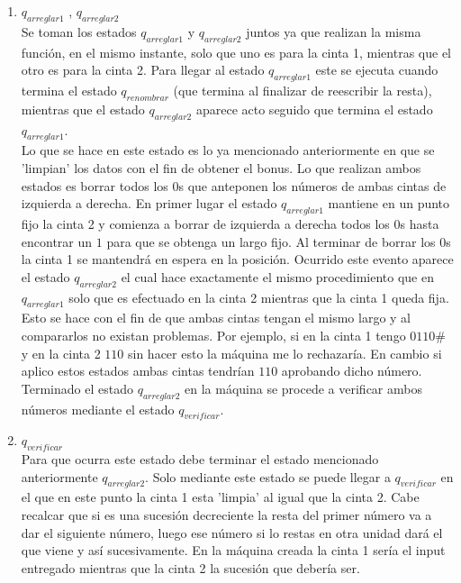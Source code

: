 \documentclass[12pt]{article}
\begin{document}
\begin{enumerate}
      \item {\large $q_{arreglar1}$ , $q_{arreglar2}$}  \vspace{0.2cm}\\
      Se toman los estados $q_{arreglar1}$ y $q_{arreglar2}$ juntos ya que realizan la misma función, en el mismo instante, solo que uno es para la cinta 1, mientras que el otro es para la cinta 2. Para llegar al estado  $q_{arreglar1}$ este se ejecuta cuando termina el estado $q_{renombrar}$ (que termina al finalizar de reescribir la resta), mientras que el estado $q_{arreglar2}$ aparece acto seguido que termina el estado $q_{arreglar1}$. \\
      Lo que se hace en este estado es lo ya mencionado anteriormente en que se 'limpian' los datos con el fin de obtener el bonus. Lo que realizan ambos estados es borrar todos los $0$s que anteponen los números de ambas cintas de izquierda a derecha. En primer lugar el estado $q_{arreglar1}$ mantiene en un punto fijo la cinta 2 y comienza a borrar de izquierda a derecha todos los $0$s hasta encontrar un $1$ para que se obtenga un largo fijo. Al terminar de borrar los $0$s la cinta 1 se mantendrá en espera en la posición. Ocurrido este evento aparece el estado $q_{arreglar2}$ el cual hace exactamente el mismo procedimiento que en $q_{arreglar1}$ solo que es efectuado en la cinta 2 mientras que la cinta 1 queda fija. Esto se hace con el fin de que ambas cintas tengan el mismo largo y al compararlos no existan problemas. Por ejemplo, si en la cinta 1 tengo $0110\text{\#}$ y en la cinta 2 $110$ sin hacer esto la máquina me lo rechazaría. En cambio si aplico estos estados ambas cintas tendrían $110$ aprobando dicho número.\\
      Terminado el estado $q_{arreglar2}$ en la máquina se procede a verificar ambos números mediante el estado $q_{verificar}$.
    \item {\large$q_{verificar}$} \vspace{0.2cm}\\
    Para que ocurra este estado debe terminar el estado mencionado anteriormente $q_{arreglar2}$. Solo mediante este estado se puede llegar a $q_{verificar}$ en el que en este punto la cinta 1 esta 'limpia' al igual que la cinta 2. Cabe recalcar que si es una sucesión decreciente la resta del primer número va a dar el siguiente número, luego ese número si lo restas en otra unidad dará el que viene y así sucesivamente. En la máquina creada la cinta 1 sería el input entregado mientras que la cinta 2 la sucesión que debería ser.\\

\end{enumerate}
\end{document}
